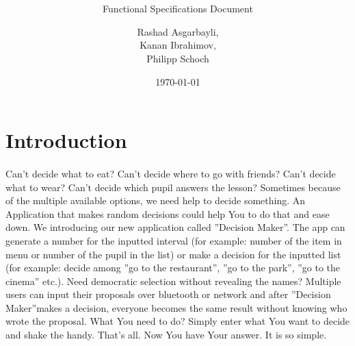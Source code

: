 \documentclass[hidelinks, a4paper, 11pt]{scrartcl}
\author{Rashad Asgarbayli,\\ Kanan Ibrahimov,\\ Philipp Schoch}
\title{\vspace{3cm}
\app
\vspace{20mm}}
\subtitle{Functional Specifications Document}
\date{\today}
\def\app{''Decision Maker''}
\begin{document}
\maketitle
\thispagestyle{empty}

\newpage

\tableofcontents

\newpage


\section{Introduction}

\paragraph{}Can't decide what to eat? Can't decide where to go with friends? Can't decide what to wear? Can't decide which pupil answers the lesson? Sometimes because of the multiple available options, we need help to decide something. An Application that makes random decisions could help You to do that and ease down. We introducing our new application called \app. The app can generate a number for the inputted interval (for example: number of the item in menu or number of the pupil in the list) or make a decision for the inputted list (for example: decide among ''go to the restaurant'', ''go to the park'', ''go to the cinema'' etc.). Need democratic selection without revealing the names? Multiple users can input their proposals over bluetooth or network and after \app makes a decision, everyone becomes the same result without knowing who wrote the proposal. What You need to do? Simply enter what You want to decide and shake the handy. That's all. Now You have Your answer. It is so simple.




















\end{document}
